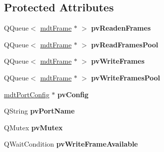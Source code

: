 \subsection*{Protected Attributes}
\begin{DoxyCompactItemize}
\item 
\hypertarget{classmdt_abstract_port_a412c3e4903bf7d90914cfeb273e82623}{
QQueue$<$ \hyperlink{classmdt_frame}{mdtFrame} $\ast$ $>$ {\bfseries pvReadenFrames}}
\label{classmdt_abstract_port_a412c3e4903bf7d90914cfeb273e82623}

\item 
\hypertarget{classmdt_abstract_port_a3d6bb9b420f64776d8fd077cf2b9b873}{
QQueue$<$ \hyperlink{classmdt_frame}{mdtFrame} $\ast$ $>$ {\bfseries pvReadFramesPool}}
\label{classmdt_abstract_port_a3d6bb9b420f64776d8fd077cf2b9b873}

\item 
\hypertarget{classmdt_abstract_port_a12cd5c1ba100b018539ed909a481d6dc}{
QQueue$<$ \hyperlink{classmdt_frame}{mdtFrame} $\ast$ $>$ {\bfseries pvWriteFrames}}
\label{classmdt_abstract_port_a12cd5c1ba100b018539ed909a481d6dc}

\item 
\hypertarget{classmdt_abstract_port_a67a8b1965f20a55ad115926aed0234b4}{
QQueue$<$ \hyperlink{classmdt_frame}{mdtFrame} $\ast$ $>$ {\bfseries pvWriteFramesPool}}
\label{classmdt_abstract_port_a67a8b1965f20a55ad115926aed0234b4}

\item 
\hypertarget{classmdt_abstract_port_a035d72bddbac47f405a8ecf0d2eeba66}{
\hyperlink{classmdt_port_config}{mdtPortConfig} $\ast$ {\bfseries pvConfig}}
\label{classmdt_abstract_port_a035d72bddbac47f405a8ecf0d2eeba66}

\item 
\hypertarget{classmdt_abstract_port_afb8f8a723ff2db5141f18750020a7ee9}{
QString {\bfseries pvPortName}}
\label{classmdt_abstract_port_afb8f8a723ff2db5141f18750020a7ee9}

\item 
\hypertarget{classmdt_abstract_port_a357bce65bc031fffa87090a26ab88a08}{
QMutex {\bfseries pvMutex}}
\label{classmdt_abstract_port_a357bce65bc031fffa87090a26ab88a08}

\item 
\hypertarget{classmdt_abstract_port_a4c81c98680c98ad6802dccd30380459d}{
QWaitCondition {\bfseries pvWriteFrameAvailable}}
\label{classmdt_abstract_port_a4c81c98680c98ad6802dccd30380459d}

\end{DoxyCompactItemize}



